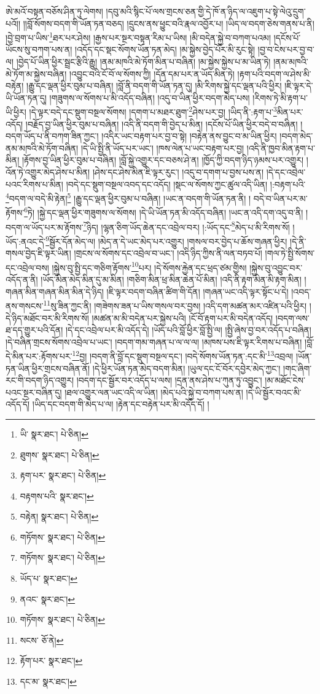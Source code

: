 ཨེ་མའོ་བསྟན་བཅོས་ཤིན་ཏུ་ལེགས། །དབུ་མའི་སྙིང་པོ་ལས་གྲངས་ཅན་གྱི་དེ་ཁོ་ན་ཉིད་ལ་འཇུག་པ་སྟེ་ལེའུ་དྲུག་པའོ།། །།བློ་སོགས་བདག་གི་ཡོན་ཏན་བཅད། །དྲུངས་ནས་ཕྱུང་བའི་རྣལ་འབྱོར་པ། །ཡིད་ལ་བདག་ཅེས་གནས་པ་ནི། །བྱེ་བྲག་པ་ཡིས་\footnote{ཡི་  སྣར་ཐང་།  པེ་ཅིན། }ཐར་པར་ཤེས། །རྒྱས་པར་སྔར་བསྟན་རིམ་པ་ཡིས། །མི་བདེན་སྐྱེ་བ་བཀག་པའམ། །དངོས་པོ་ཡོངས་སུ་བཀག་པས་ན། །འདོད་དང་སྡང་སོགས་ཡོན་ཏན་མེད། །མ་སྐྱེས་བྱེད་པོར་མི་རུང་སྟེ། །བྱ་བ་ངེས་པར་བྱ་བ་ལ། །བྱེད་པོ་ཡིན་ཕྱིར་སྦྲང་རྩིའི་རྒྱུ། །ནམ་མཁའི་མེ་ཏོག་མིན་པ་བཞིན། །མ་སྐྱེས་སྐྱེས་པ་མ་ཡིན་ཏེ། །ནམ་མཁའི་མེ་ཏོག་མ་སྐྱེས་བཞིན། །འབྱུང་བའི་ངོ་བོ་ལ་སོགས་ཀྱི། །དོན་དམ་པར་ན་ཡོད་མིན་ཏེ། །རྟག་པའི་བདག་ལ་ཤེས་མི་བརྟེན། །རྒྱུ་དང་ལྡན་ཕྱིར་བུམ་པ་བཞིན། །བློ་ནི་བདག་གི་ཡོན་ཏན་དུ། །མི་རིགས་སྐྱེ་དང་ལྡན་པའི་ཕྱིར། །ཇི་ལྟར་དེ་ཡི་ཡོན་ཏན་དུ། །གཟུགས་ལ་སོགས་པ་མི་འདོད་བཞིན། །འདུ་བ་ཡིན་ཕྱིར་བདག་མེད་པས། །རིགས་ཏེ་མི་རྟག་པ་ཡི་ཕྱིར། །དེ་ལྟར་བདེ་དང་སྡུག་བསྔལ་སོགས། །དགག་པ་མཐར་ཐུག་\footnote{ཐུགས་  སྣར་ཐང་།  པེ་ཅིན། }ཤེས་པར་བྱ། །ཡིད་ནི་:རྟག་པ་\footnote{རྟག་པར་  སྣར་ཐང་།  པེ་ཅིན། }མིན་པར་འདོད། །བརྗོད་བྱ་ཡིན་ཕྱིར་བུམ་པ་བཞིན། །འདི་ནི་བདག་གི་བྱེད་པ་མིན། །དངོས་པོ་ཡིན་ཕྱིར་བདེ་བ་བཞིན། །བདག་ཡོད་པ་ནི་བཀག་ཟིན་ཀྱང་། །འདིར་ཡང་བརྟག་པར་བྱ་བ་སྟེ། །བརྟེན་ནས་བྱུང་བ་མ་ཡིན་ཕྱིར། །བདག་མེད་ནམ་མཁའི་མེ་ཏོག་བཞིན། །དེ་ཡི་སྤྱི་ནི་ཡོད་པར་ཡང་། །ཁས་ལེན་པ་ཡང་བརྟག་པར་བྱ། །འདི་ནི་ཁྱབ་མིན་རྟག་པ་མིན། །རྟོགས་བྱ་ཡིན་ཕྱིར་བུམ་པ་བཞིན། །བློ་སྐྱེ་འགྱུར་དང་བཅས་ཤེ་ན། །ཁྱོད་ཀྱི་བདག་ཉིད་ཉམས་པར་འགྱུར། །འོན་ཏེ་འགྱུར་མེད་ཤེས་པ་མིན། །ཤེས་དང་ཤེས་མིན་ཇི་ལྟར་རུང་། །འདུ་བ་དགག་པ་བྱས་པས་ན། །དེ་དང་འབྲེལ་པའང་རིགས་པ་མིན། །བདེ་དང་སྡུག་བསྔལ་འབད་དང་འདོད། །སྡང་ལ་སོགས་ཀྱང་ཚུལ་འདི་ཡིན། །:བརྟག་པའི་\footnote{བརྟགས་པའི་  སྣར་ཐང་། }བདག་ལ་བདེ་མི་རྟེན།\footnote{བརྟེན།  སྣར་ཐང་།  པེ་ཅིན། } །རྒྱུ་དང་ལྡན་ཕྱིར་བུམ་པ་བཞིན། །ཡང་ན་བདག་གི་ཡོན་ཏན་ནི། །
བདེ་བ་ཡིན་པར་མ་རྟོགས་\footnote{གཏོགས་  སྣར་ཐང་།  པེ་ཅིན། }ཏེ། །སྐྱེ་དང་ལྡན་ཕྱིར་གཟུགས་ལ་སོགས། །དེ་ཡི་ཡོན་ཏན་མི་འདོད་བཞིན། །ཡང་ན་འདི་དག་འདུ་བ་ནི། །བདག་ལ་ཡོད་པར་མ་རྟོགས་\footnote{གཏོགས་  སྣར་ཐང་།  པེ་ཅིན། }ཉིད། །ལྷན་ཅིག་ཡོད་ཆེན་དང་འབྲེལ་བར། །:ཡོད་དང་\footnote{ཡོད་པ་  སྣར་ཐང་། }མེད་པ་མི་རིགས་སོ། །ཡོད་:ནའང་དེ་\footnote{ནའང་  སྣར་ཐང་། }སྦྱོར་དོན་མེད་ལ། །མེད་ན་དེ་ཡང་མེད་པར་འགྱུར། །གསལ་བར་བྱེད་པ་ཆོས་གཞན་ཕྱིར། །དེ་ནི་གསལ་བྱེད་ཇི་ལྟར་ཡིན། །གྲངས་ལ་སོགས་དང་འབྲེལ་བ་ཡང་། །འདི་ཉིད་ཀྱིས་ནི་ལན་བཏབ་པོ། །གལ་ཏེ་སྤྱི་སོགས་དང་འབྲེལ་བས། །སྐྱེས་བུ་སྤྱི་དང་གཅིག་རྟོགས་\footnote{གཏོགས་  སྣར་ཐང་།  པེ་ཅིན། }པར། །དེ་སོགས་རྐྱེན་དང་ཕྲད་ཙམ་གྱིས། །སྐྱེས་བུ་འབྱུང་བར་འདོད་ན་ནི། །ཡོད་མིན་མེད་མིན་དུ་མ་མིན། །གཅིག་མིན་ཕྲ་མིན་ཆེན་པོ་མིན། །འདི་ནི་རྟག་མིན་མི་རྟག་མིན། །གཞན་མིན་གཞན་མིན་མིན་དེ་ཉིད། །ཇི་ལྟར་བདག་བཞིན་ཚིག་གི་དོན། །གཞན་ཡང་འདི་ལྟར་སྟོང་པ་དེ། །འབད་ནས་གསངས་\footnote{སངས་  ཅོ་ནེ། }སུ་ཟིན་ཀྱང་ནི། །གཟེགས་ཟན་པ་ཡིས་གསལ་བར་བྱས། །འདི་དག་མཚན་མར་འཛིན་པའི་ཕྱིར། །དེ་ཉིད་མཐོང་བར་མི་རིགས་སོ། །མཚན་མ་མི་བདེན་པར་སྐྱེས་པའི། །ངོ་བོ་རྟག་པར་མི་བདེན་འདོད། །བདག་ལས་ཐ་དད་གྱུར་པའི་དོན། །དེ་དང་འབྲེལ་པར་མི་འདོད་དེ། །ཡོད་པའི་བློ་ཕྱིར་བློ་སྤྱི་ལ། །སྤྱི་ཞེས་བྱ་བར་འདོད་པ་བཞིན། །དེ་བཞིན་གྲངས་སོགས་འབྲེལ་པ་ཡང་། །བདག་གམ་གཞན་པ་ལ་ལ་ལ། །མཁས་པས་ཇི་ལྟར་རིགས་པ་བཞིན། །བློ་དེ་མིན་པར་:རྟོགས་པར་\footnote{རྟོག་པར་  སྣར་ཐང་། }བྱ། །བདག་ནི་བློ་དང་སྡུག་བསྔལ་དང་། །བདེ་སོགས་ཡོན་ཏན་:དང་མི་\footnote{དང་མ་  སྣར་ཐང་། }འབྲལ། །ཡོན་ཏན་ཡིན་ཕྱིར་གྲངས་བཞིན་ནོ། །དེ་ཕྱིར་ཡོན་ཏན་མེད་བདག་མིན། །ཡུལ་དང་ངོ་བོར་དབྱེར་མེད་ཀྱང་། །གང་ཞིག་རང་གི་བདག་ཉིད་འགྱུར། །བདག་དང་སྦྱོར་བར་འདོད་པ་ལས། །དྲན་ནས་ཤེས་པ་ཀུན་ཏུ་འབྱུང་། །མ་མཐོང་ངེས་པའང་སྔར་བཞིན་དུ། །ཐལ་འགྱུར་ལན་ཡང་འདི་ལ་ཡིན། །མེད་པའི་སྐྱེ་བ་བཀག་པས་ན། །དེ་ཡི་སྦྱོར་བའང་མི་འདོད་དོ། །ཡིད་དང་བདག་གི་མེད་པ་ལ། །རྟེན་དང་བརྟེན་པར་མི་འདོད་དོ། །
